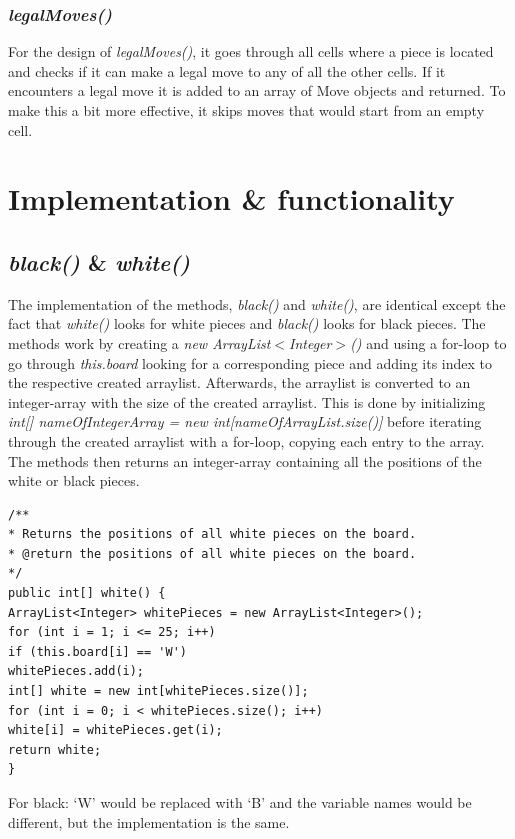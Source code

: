 \documentclass[12pt, a4paper]{article}
\begin{document}
\subsubsection{\emph{legalMoves()}}
For the design of \emph{legalMoves()}, it goes through all cells where a piece is located and checks if it can make a legal move to any of all the other cells. If it encounters a legal move it is added to an array of Move objects and returned. To make this a bit more effective, it skips moves that would start from an empty cell.

\section{Implementation \& functionality}

\subsection{\emph{black()} \& \emph{white()}}
The implementation of the methods, \emph{black()} and \emph{white()}, are identical except the fact that \emph{white()} looks for white pieces and \emph{black()} looks for black pieces. The methods work by creating a \emph{new ArrayList$<$Integer$>$()} and using a for-loop to go through \emph{this.board} looking for a corresponding piece and adding its index to the respective created arraylist. Afterwards, the arraylist is converted to an integer-array with the size of the created arraylist. This is done by initializing \emph{int[] nameOfIntegerArray = new int[nameOfArrayList.size()]} before iterating through the created arraylist with a for-loop, copying each entry to the array. The methods then returns an integer-array containing all the positions of the white or black pieces.

\begin{lstlisting}[style=JavaStyle]
/**
* Returns the positions of all white pieces on the board.
* @return the positions of all white pieces on the board.
*/
public int[] white() {
ArrayList<Integer> whitePieces = new ArrayList<Integer>();
for (int i = 1; i <= 25; i++)
if (this.board[i] == 'W')
whitePieces.add(i);
int[] white = new int[whitePieces.size()];
for (int i = 0; i < whitePieces.size(); i++)
white[i] = whitePieces.get(i);
return white;
}
\end{lstlisting}

For black: ‘W’ would be replaced with ‘B’ and the variable names would be different, but the implementation is the same.
\end{document}
